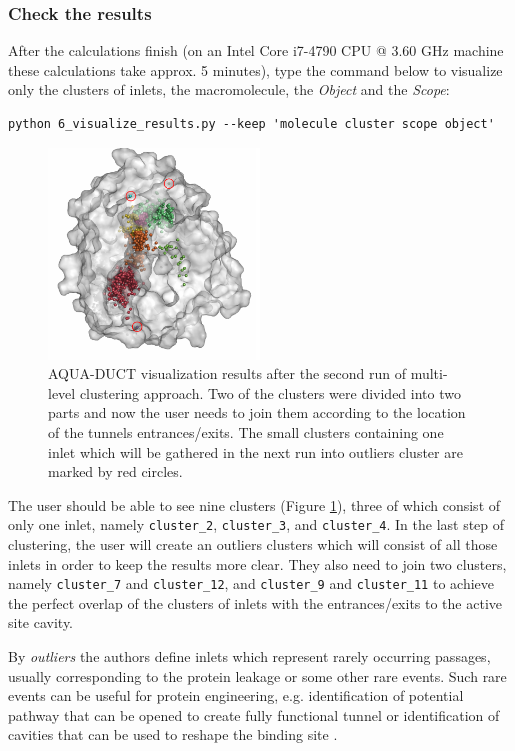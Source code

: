 \documentclass[9pt,tutorial]{livecoms}
\begin{document}
\subsubsection{Check the results}
After the calculations finish (on an Intel Core i7-4790 CPU @ 3.60 GHz machine these calculations take approx. 5 minutes), type the command below to visualize only the clusters of inlets, the macromolecule, the \emph{Object} and the \emph{Scope}:
\begin{lstlisting}[columns=fullflexible]
python 6_visualize_results.py --keep 'molecule cluster scope object'
\end{lstlisting}

\begin{figure}[ht!]
\centering
\includegraphics[width=0.5\textwidth]{Tut2.2.png}
\caption{AQUA-DUCT visualization results after the second run of multi-level clustering approach. Two of the clusters were divided into two parts and now the user needs to join them according to the location of the tunnels entrances/exits. The small clusters containing one inlet which will be gathered in the next run into outliers cluster are marked by red circles.}
\label{Tut2.2}
\end{figure}

The user should be able to see nine clusters (Figure \ref{Tut2.2}), three of which consist of only one inlet, namely \texttt{cluster\_2}, \texttt{cluster\_3}, and \texttt{cluster\_4}. In the last step of clustering, the user will create an outliers clusters which will consist of all those inlets in order to keep the results more clear. They also need to join two clusters, namely \texttt{cluster\_7} and \texttt{cluster\_12}, and \texttt{cluster\_9} and \texttt{cluster\_11} to achieve the perfect overlap of the clusters of inlets with the entrances/exits to the active site cavity.

By \textit{outliers} the authors define inlets which represent rarely occurring passages, usually corresponding to the protein leakage or some other rare events. Such rare events can be useful for protein engineering, e.g. identification of potential pathway that can be opened to create fully functional tunnel \cite{Magdziarz2020,Brezovsky2016} or identification of cavities that can be used to reshape the binding site \cite{Mitusinska2018}.
\end{document}
